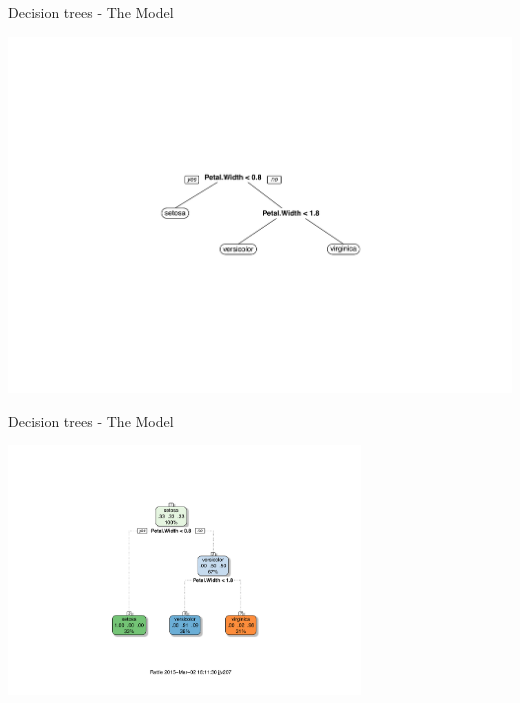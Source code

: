 \documentclass[pdf]{beamer}
\begin{document}
\begin{frame}{Decision trees - The Model}
\begin{center}
	\includegraphics[width=\textwidth]{crudeTree.pdf}
\end{center}
\end{frame}
\begin{frame}{Decision trees - The Model}
\begin{center}
	\includegraphics[width=0.7\textwidth]{niceTree.pdf}	
\end{center}
\end{frame}
\end{document}
